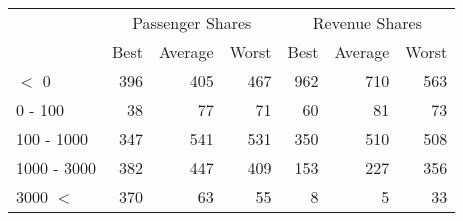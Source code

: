 
\begin{tabular}[t]{lrrrrrr}
\toprule
\multicolumn{1}{c}{ } & \multicolumn{3}{c}{Passenger Shares} & \multicolumn{3}{c}{Revenue Shares} \\
\cmidrule(l{3pt}r{3pt}){2-4} \cmidrule(l{3pt}r{3pt}){5-7}
 & Best & Average & Worst & Best & Average & Worst\\
\midrule
$<$ 0 & 396 & 405 & 467 & 962 & 710 & 563\\
0 - 100 & 38 & 77 & 71 & 60 & 81 & 73\\
100 - 1000 & 347 & 541 & 531 & 350 & 510 & 508\\
1000 - 3000 & 382 & 447 & 409 & 153 & 227 & 356\\
3000 $<$ & 370 & 63 & 55 & 8 & 5 & 33\\
\bottomrule
\end{tabular}
